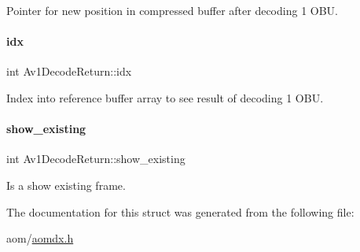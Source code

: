 Pointer for new position in compressed buffer after decoding 1 O\+BU. \mbox{\label{structAv1DecodeReturn_aeefcb8b1f412902428fa86ea066e4414}} 
\paragraph{\texorpdfstring{idx}{idx}}
{\footnotesize\ttfamily int Av1\+Decode\+Return\+::idx}

Index into reference buffer array to see result of decoding 1 O\+BU. \mbox{\label{structAv1DecodeReturn_ac95f1cc492f7bb172dc1d9132674c3ec}} 
\paragraph{\texorpdfstring{show\+\_\+existing}{show\_existing}}
{\footnotesize\ttfamily int Av1\+Decode\+Return\+::show\+\_\+existing}

Is a show existing frame. 

The documentation for this struct was generated from the following file\+:\begin{DoxyCompactItemize}
\item 
aom/\hyperlink{aomdx_8h}{aomdx.\+h}\end{DoxyCompactItemize}
